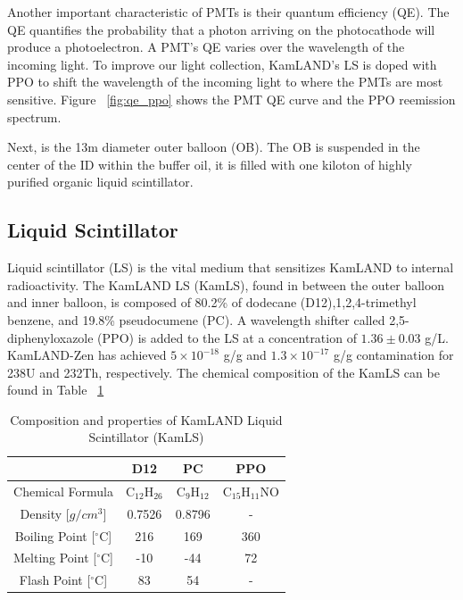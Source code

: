 Another important characteristic of PMTs is their quantum efficiency (QE). The QE quantifies the probability that a photon arriving on the photocathode will produce a photoelectron. A PMT's QE varies over the wavelength of the incoming light. To improve our light collection, KamLAND's LS is doped with PPO to shift the wavelength of the incoming light to where the PMTs are most sensitive. Figure ~\ref{fig:qe_ppo} shows the PMT QE curve and the PPO reemission spectrum.

Next, is the 13m diameter outer balloon (OB). The OB is suspended in the center of the ID within the buffer oil, it is filled with one kiloton of highly purified organic liquid scintillator.

\subsection{Liquid Scintillator}
Liquid scintillator (LS) is the vital medium that sensitizes KamLAND to internal radioactivity. The KamLAND LS (KamLS), found in between the outer balloon and inner balloon, is composed of 80.2\% of dodecane (D12),1,2,4-trimethyl benzene, and 19.8\% pseudocumene (PC). A wavelength shifter called 2,5-diphenyloxazole (PPO) is added to the LS at a concentration of $1.36 \pm 0.03$ g/L. KamLAND-Zen has achieved $5 \times 10^{-18}$ g/g and $1.3 \times 10^{-17}$ g/g contamination for 238U and 232Th, respectively. The chemical composition of the KamLS can be found in Table ~\ref{tbl:kamls}

\begin{table}[h]
	\centering
	\renewcommand{\arraystretch}{1.2}
	\begin{tabular}{c|ccc}
		\hline
		& D12 & PC & PPO \\
		\hline
		Chemical Formula & C$_{12}$H$_{26}$ & C$_9$H$_{12}$ & C$_{15}$H$_{11}$NO \\
		Density [$g/cm^3$] & 0.7526 & 0.8796 & -\\
		Boiling Point [$^\circ$C] & 216 & 169 & 360 \\
		Melting Point [$^\circ$C] & -10 & -44 & 72 \\
		Flash Point [$^\circ$C] & 83 & 54 & - \\ \hline
	\end{tabular}
	\caption{Composition and properties of KamLAND Liquid Scintillator (KamLS)}
	\label{tbl:kamls}
\end{table}


